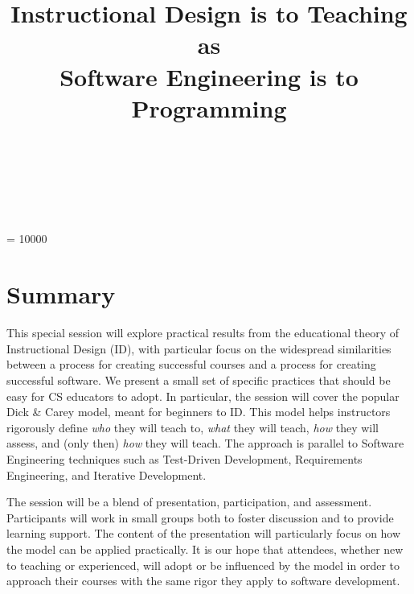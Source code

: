 \documentclass{sig-alternate}
\begin{document}

 

\widowpenalty = 10000

\title{Instructional Design is to Teaching as\\Software Engineering is to Programming}
\author{
	\\
	\\
    \\
}

\maketitle




\section{Summary}

This special session will explore practical results from 
the educational theory of Instructional Design (ID), with particular focus on the widespread similarities between a process for creating successful courses and a process for creating successful software.
We present a small set of specific practices that should be easy for CS educators to adopt.
In particular, the session will cover the popular Dick \& Carey model, meant for beginners to ID.
This model helps instructors rigorously define \textit{who} they will teach to, \textit{what} they will teach, \textit{how} they will assess, and (only then) \textit{how} they will teach.
The approach is parallel to Software Engineering techniques such as Test-Driven Development, Requirements Engineering, and Iterative Development.

The session will be a blend of presentation, participation, and assessment.
Participants will work in small groups both to foster discussion and to provide learning support.
The content of the presentation will particularly focus on how the model can be applied practically.
It is our hope that attendees, whether new to teaching or experienced, will adopt or be influenced by the model in order to approach their courses with the same rigor they apply to software development.
\end{document}
